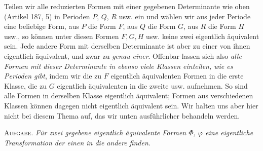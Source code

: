 Teilen wir alle reduzierten Formen mit einer gegebenen Determinante wie oben (Artikel 187, 5) in Perioden $P$, $Q$, $R$ usw. ein und wählen wir aus jeder Periode eine beliebige Form, aus $P$ die Form $F$, aus $Q$ die Form $G$, aus $R$ die Form $H$ usw., so können unter diesen Formen $F,G,H$ usw. keine zwei eigentlich äquivalent sein. Jede andere Form mit derselben Determinante ist aber zu einer von ihnen eigentlich äquivalent, und zwar zu \textit{genau einer}. Offenbar lassen sich also \textit{alle Formen mit dieser Determinante in ebenso viele Klassen einteilen, wie es Perioden gibt}, indem wir die zu $F$ eigentlich äquivalenten Formen in die erste Klasse, die zu $G$ eigentlich äquivalenten in die zweite usw. aufnehmen. So sind alle Formen in derselben Klasse eigentlich äquivalent; Formen aus verschiedenen Klassen können dagegen nicht eigentlich äquivalent sein. Wir halten uns aber hier nicht bei diesem Thema auf, das wir unten ausführlicher behandeln werden.

\textsc{Aufgabe.} \textit{Für zwei gegebene eigentlich äquivalente Formen $\Phi$, $\varphi$ eine eigentliche Transformation der einen in die andere finden.}

